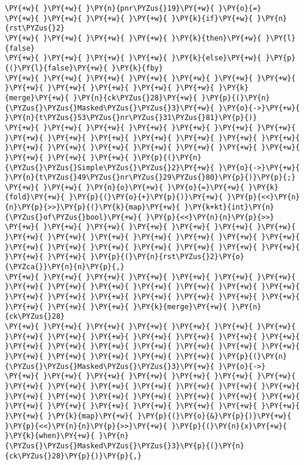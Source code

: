 \begin{Verbatim}[commandchars=\\\{\}]
\PY{+w}{ }\PY{+w}{ }\PY{n}{pnr\PYZus{}19}\PY{+w}{ }\PY{o}{=}
\PY{+w}{ }\PY{+w}{ }\PY{+w}{ }\PY{+w}{ }\PY{k}{if}\PY{+w}{ }\PY{n}{rst\PYZus{}2}
\PY{+w}{ }\PY{+w}{ }\PY{+w}{ }\PY{+w}{ }\PY{k}{then}\PY{+w}{ }\PY{l}{false}
\PY{+w}{ }\PY{+w}{ }\PY{+w}{ }\PY{+w}{ }\PY{k}{else}\PY{+w}{ }\PY{p}{(}\PY{l}{false}\PY{+w}{ }\PY{k}{fby}
\PY{+w}{ }\PY{+w}{ }\PY{+w}{ }\PY{+w}{ }\PY{+w}{ }\PY{+w}{ }\PY{+w}{ }\PY{+w}{ }\PY{+w}{ }\PY{+w}{ }\PY{+w}{ }\PY{+w}{ }\PY{k}{merge}\PY{+w}{ }\PY{n}{ck\PYZus{}28}\PY{+w}{ }\PY{p}{(}\PY{n}{\PYZus{}\PYZus{}Masked\PYZus{}\PYZus{}3}\PY{+w}{ }\PY{o}{->}\PY{+w}{ }\PY{n}{t\PYZus{}53\PYZus{}nr\PYZus{}31\PYZus{}81}\PY{p}{)}
\PY{+w}{ }\PY{+w}{ }\PY{+w}{ }\PY{+w}{ }\PY{+w}{ }\PY{+w}{ }\PY{+w}{ }\PY{+w}{ }\PY{+w}{ }\PY{+w}{ }\PY{+w}{ }\PY{+w}{ }\PY{+w}{ }\PY{+w}{ }\PY{+w}{ }\PY{+w}{ }\PY{+w}{ }\PY{+w}{ }\PY{+w}{ }\PY{+w}{ }\PY{+w}{ }\PY{+w}{ }\PY{+w}{ }\PY{+w}{ }\PY{p}{(}\PY{n}{\PYZus{}\PYZus{}Simple\PYZus{}\PYZus{}2}\PY{+w}{ }\PY{o}{->}\PY{+w}{ }\PY{n}{t\PYZus{}49\PYZus{}nr\PYZus{}29\PYZus{}80}\PY{p}{)}\PY{p}{;}
\PY{+w}{ }\PY{+w}{ }\PY{n}{o}\PY{+w}{ }\PY{o}{=}\PY{+w}{ }\PY{k}{fold}\PY{+w}{ }\PY{p}{(}\PY{o}{+}\PY{p}{)}\PY{+w}{ }\PY{p}{<<}\PY{n}{n}\PY{p}{>>}\PY{p}{(}\PY{k}{map}\PY{+w}{ }\PY{k+kt}{int}\PY{n}{\PYZus{}of\PYZus{}bool}\PY{+w}{ }\PY{p}{<<}\PY{n}{n}\PY{p}{>>}
\PY{+w}{ }\PY{+w}{ }\PY{+w}{ }\PY{+w}{ }\PY{+w}{ }\PY{+w}{ }\PY{+w}{ }\PY{+w}{ }\PY{+w}{ }\PY{+w}{ }\PY{+w}{ }\PY{+w}{ }\PY{+w}{ }\PY{+w}{ }\PY{+w}{ }\PY{+w}{ }\PY{+w}{ }\PY{+w}{ }\PY{+w}{ }\PY{+w}{ }\PY{+w}{ }\PY{+w}{ }\PY{+w}{ }\PY{p}{(}\PY{n}{rst\PYZus{}2}\PY{o}{\PYZca{}}\PY{n}{n}\PY{p}{,}
\PY{+w}{ }\PY{+w}{ }\PY{+w}{ }\PY{+w}{ }\PY{+w}{ }\PY{+w}{ }\PY{+w}{ }\PY{+w}{ }\PY{+w}{ }\PY{+w}{ }\PY{+w}{ }\PY{+w}{ }\PY{+w}{ }\PY{+w}{ }\PY{+w}{ }\PY{+w}{ }\PY{+w}{ }\PY{+w}{ }\PY{+w}{ }\PY{+w}{ }\PY{+w}{ }\PY{+w}{ }\PY{+w}{ }\PY{+w}{ }\PY{k}{merge}\PY{+w}{ }\PY{n}{ck\PYZus{}28}
\PY{+w}{ }\PY{+w}{ }\PY{+w}{ }\PY{+w}{ }\PY{+w}{ }\PY{+w}{ }\PY{+w}{ }\PY{+w}{ }\PY{+w}{ }\PY{+w}{ }\PY{+w}{ }\PY{+w}{ }\PY{+w}{ }\PY{+w}{ }\PY{+w}{ }\PY{+w}{ }\PY{+w}{ }\PY{+w}{ }\PY{+w}{ }\PY{+w}{ }\PY{+w}{ }\PY{+w}{ }\PY{+w}{ }\PY{+w}{ }\PY{+w}{ }\PY{+w}{ }\PY{p}{(}\PY{n}{\PYZus{}\PYZus{}Masked\PYZus{}\PYZus{}3}\PY{+w}{ }\PY{o}{->}
\PY{+w}{ }\PY{+w}{ }\PY{+w}{ }\PY{+w}{ }\PY{+w}{ }\PY{+w}{ }\PY{+w}{ }\PY{+w}{ }\PY{+w}{ }\PY{+w}{ }\PY{+w}{ }\PY{+w}{ }\PY{+w}{ }\PY{+w}{ }\PY{+w}{ }\PY{+w}{ }\PY{+w}{ }\PY{+w}{ }\PY{+w}{ }\PY{+w}{ }\PY{+w}{ }\PY{+w}{ }\PY{+w}{ }\PY{+w}{ }\PY{+w}{ }\PY{+w}{ }\PY{+w}{ }\PY{+w}{ }\PY{+w}{ }\PY{k}{map}\PY{+w}{ }\PY{p}{(}\PY{o}{&}\PY{p}{)}\PY{+w}{ }\PY{p}{<<}\PY{n}{n}\PY{p}{>>}\PY{+w}{ }\PY{p}{(}\PY{n}{x}\PY{+w}{ }\PY{k}{when}\PY{+w}{ }\PY{n}{\PYZus{}\PYZus{}Masked\PYZus{}\PYZus{}3}\PY{p}{(}\PY{n}{ck\PYZus{}28}\PY{p}{)}\PY{p}{,}

\end{Verbatim}
